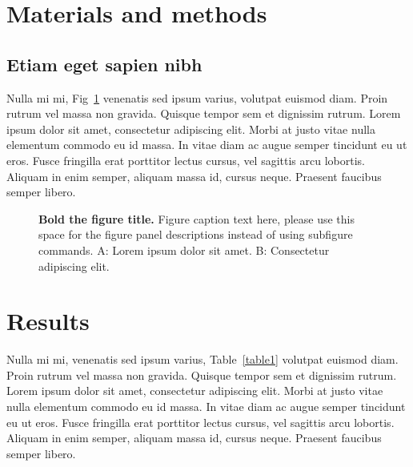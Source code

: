 \documentclass[10pt,letterpaper]{article}
\begin{document}
\section*{Materials and methods}
\subsection*{Etiam eget sapien nibh}

Nulla mi mi, Fig~\ref{fig1} venenatis sed ipsum varius, volutpat euismod diam. Proin rutrum vel massa non gravida. Quisque tempor sem et dignissim rutrum. Lorem ipsum dolor sit amet, consectetur adipiscing elit. Morbi at justo vitae nulla elementum commodo eu id massa. In vitae diam ac augue semper tincidunt eu ut eros. Fusce fringilla erat porttitor lectus cursus,  vel sagittis arcu lobortis. Aliquam in enim semper, aliquam massa id, cursus neque. Praesent faucibus semper libero.

\begin{figure}[!h]
\caption{{\bf Bold the figure title.}
Figure caption text here, please use this space for the figure panel descriptions instead of using subfigure commands. A: Lorem ipsum dolor sit amet. B: Consectetur adipiscing elit.}
\label{fig1}
\end{figure}

\section*{Results}
Nulla mi mi, venenatis sed ipsum varius, Table~\ref{table1} volutpat euismod diam. Proin rutrum vel massa non gravida. Quisque tempor sem et dignissim rutrum. Lorem ipsum dolor sit amet, consectetur adipiscing elit. Morbi at justo vitae nulla elementum commodo eu id massa. In vitae diam ac augue semper tincidunt eu ut eros. Fusce fringilla erat porttitor lectus cursus, vel sagittis arcu lobortis. Aliquam in enim semper, aliquam massa id, cursus neque. Praesent faucibus semper libero.
\end{document}
